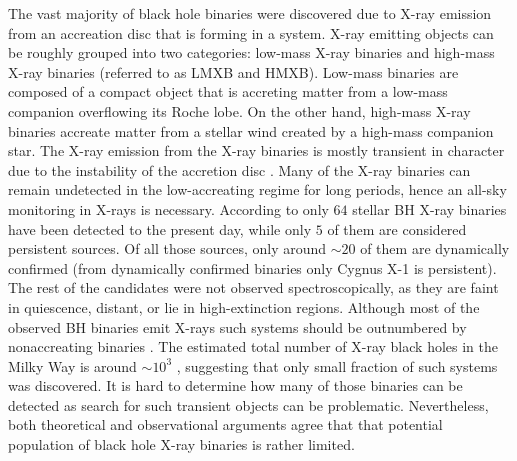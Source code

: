 \documentclass{pracalicmgr}
\begin{document}
The vast majority of black hole binaries were discovered due to X-ray emission from an accreation disc that is forming in a system.
X-ray emitting objects can be roughly grouped into two categories: low-mass X-ray binaries and high-mass X-ray binaries (referred to as LMXB and HMXB).
Low-mass binaries are composed of a compact object that is accreting matter from a low-mass companion overflowing its Roche lobe. On the other hand, high-mass X-ray
binaries accreate matter from a stellar wind created by a high-mass companion star.
The X-ray emission from the X-ray binaries is mostly transient in character \citep{bambi_transient_2016}
due to the instability of the accretion disc \citep{lasota_disc_2001}. Many of the X-ray binaries can remain undetected in the low-accreating
regime for long periods, hence an all-sky monitoring in X-rays is necessary. According to \citet{corral-santana_blackcat_2016} 
only $64$ stellar BH X-ray binaries have been detected to the present day, while only $5$ of them are considered persistent sources. 
Of all those sources, only around $\sim 20$ of them are dynamically confirmed (from dynamically confirmed binaries only Cygnus X-1 is persistent). 
The rest of the candidates were not observed spectroscopically, as they are faint in quiescence, distant, or lie in high-extinction regions. 
Although most of the observed BH binaries emit X-rays such systems should be outnumbered by nonaccreating binaries \citep{langer_properties_2020}. 
The estimated total number of X-ray black holes in the Milky Way is around $\sim 10^3$ \citep{corral-santana_blackcat_2016}, suggesting that only small fraction
of such systems was discovered. It is hard to determine how many of those binaries can be detected as search for such transient objects can be problematic.
Nevertheless, both theoretical and observational arguments agree that that potential population of black hole X-ray binaries is rather limited.
\end{document}
